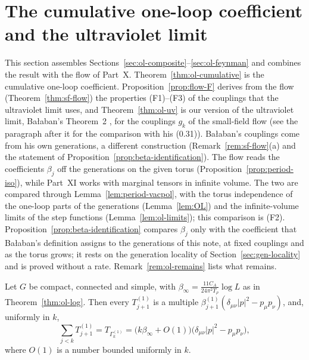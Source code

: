 \section{The cumulative one-loop coefficient and the ultraviolet limit}\label{sec:ol-uv}

This section assembles Sections~\ref{sec:ol-composite}--\ref{sec:ol-feynman} and combines the result with the flow of Part~X. Theorem~\ref{thm:ol-cumulative} is the cumulative one-loop coefficient. Proposition~\ref{prop:flow-F} derives from the flow (Theorem~\ref{thm:sf-flow}) the properties (F1)--(F3) of the couplings that the ultraviolet limit uses, and Theorem~\ref{thm:ol-uv} is our version of the ultraviolet limit, Ba\l aban's Theorem~2 \cite{BalYM4I}, for the couplings $g_k$ of the small-field flow (see the paragraph after it for the comparison with his (0.31)). Ba\l aban's couplings come from his own generations, a different construction (Remark~\ref{rem:sf-flow}(a) and the statement of Proposition~\ref{prop:beta-identification}). The flow reads the coefficients $\beta_j$ off the generations on the given torus (Proposition~\ref{prop:period-iso}), while Part~XI works with marginal tensors in infinite volume. The two are compared through Lemma~\ref{lem:period-vacpol}, with the torus independence of the one-loop parts of the generations (Lemma~\ref{lem:OL}) and the infinite-volume limits of the step functions (Lemma~\ref{lem:ol-limits}); this comparison is (F2). Proposition~\ref{prop:beta-identification} compares $\beta_j$ only with the coefficient that Ba\l aban's definition \cite[(1.20)--(1.22)]{BalYM4I} assigns to the generations of this note, at fixed couplings and as the torus grows; it rests on the generation locality of Section~\ref{sec:gen-locality} and is proved without a rate. Remark~\ref{rem:ol-remains} lists what remains.

\begin{theorem}\label{thm:ol-cumulative}
Let $G$ be compact, connected and simple, with $\beta_\infty=\frac{11C_A}{24\pi^2T_\rho}\log L$ as in Theorem~\ref{thm:ol-log}. Then every $T^{(1)}_{j+1}$ is a multiple $\beta^{(1)}_{j+1}(\delta_{\mu\nu}|p|^2-p_\mu p_\nu)$, and, uniformly in $k$,
\[
\sum_{j<k}T^{(1)}_{j+1}=T_{\Gamma^{(1)}_k}=\big(k\beta_\infty+O(1)\big)\big(\delta_{\mu\nu}|p|^2-p_\mu p_\nu\big),
\]
where $O(1)$ is a number bounded uniformly in $k$.
\end{theorem}

